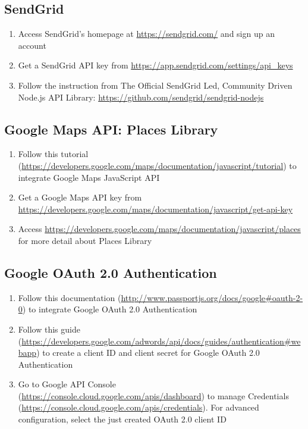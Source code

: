 \tocless\subsection{SendGrid}
\begin{enumerate}
\item Access SendGrid’s homepage at \href{https://sendgrid.com/}{https://sendgrid.com/} and sign up an account
\item Get a SendGrid API key from \href{https://app.sendgrid.com/settings/api_keys}{https://app.sendgrid.com/settings/api\_keys}
\item Follow the instruction from The Official SendGrid Led, Community Driven Node.js API Library: \href{https://github.com/sendgrid/sendgrid-nodejs}{https://github.com/sendgrid/sendgrid-nodejs}
\end{enumerate}

\tocless\subsection{Google Maps API: Places Library}
\begin{enumerate}
\item Follow this tutorial (\href{https://developers.google.com/maps/documentation/javascript/tutorial}{https://developers.google.com/maps/documentation/javascript/tutorial}) to integrate Google Maps JavaScript API
\item Get a Google Maps API key from \href{https://developers.google.com/maps/documentation/javascript/get-api-key}{https://developers.google.com/maps/documentation/javascript/get-api-key}
\item Access \href{https://developers.google.com/maps/documentation/javascript/places}{https://developers.google.com/maps/documentation/javascript/places} for more detail about Places Library
\end{enumerate}

\tocless\subsection{Google OAuth 2.0 Authentication}
\begin{enumerate}
\item Follow this documentation (\href{http://www.passportjs.org/docs/google#oauth-2-0}{http://www.passportjs.org/docs/google\#oauth-2-0}) to integrate Google OAuth 2.0 Authentication
\item Follow this guide (\href{https://developers.google.com/adwords/api/docs/guides/authentication#webapp}{https://developers.google.com/adwords/api/docs/guides/authentication\#webapp}) to create a client ID and client secret for Google OAuth 2.0 Authentication
\item Go to Google API Console (\href{https://console.cloud.google.com/apis/dashboard}{https://console.cloud.google.com/apis/dashboard}) to manage Credentials (\href{https://console.cloud.google.com/apis/credentials}{https://console.cloud.google.com/apis/credentials}). For advanced configuration, select the just created OAuth 2.0 client ID
\end{enumerate}
